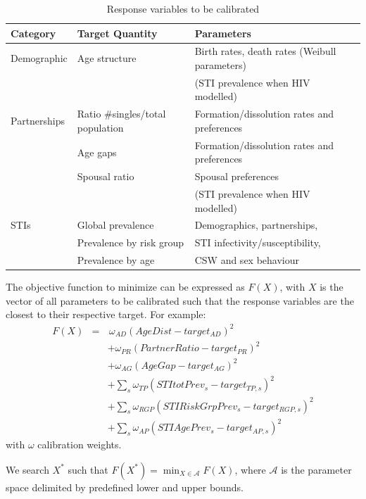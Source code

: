 \documentclass[11pt, onecolumn]{article}
\begin{document}
\begin{table}[htdp]
\caption{Response variables to be calibrated}
\begin{center}
\begin{tabular}{lll}

\hline
\textbf{Category} & \textbf{Target Quantity} & \textbf{Parameters} \\

\hline
Demographic  &  Age structure & Birth rates, death rates (Weibull parameters)\\
 & & (STI prevalence when HIV modelled)\\
\hline
Partnerships  &  Ratio \#singles/total population  &  Formation/dissolution rates and preferences \\
  &  Age gaps &   Formation/dissolution rates and preferences  \\
  &  Spousal ratio & Spousal preferences \\
 & & (STI prevalence when HIV modelled)\\
\hline
STIs	& Global prevalence & Demographics, partnerships,\\
	& Prevalence by risk group & STI infectivity/susceptibility,\\
	& Prevalence by age & CSW and sex behaviour\\
\hline
\end{tabular}
\end{center}
\label{tab:calibration}
\end{table}


The objective function to minimize can be expressed as $F(X)$, with $X$ is the vector of all parameters to be calibrated such that the response variables are the closest to their respective target. For example:
\begin{eqnarray*}
F(X) & =&\,\omega_{AD}(AgeDist - target_{AD})^2 \\
& & + \omega_{PR}(PartnerRatio - target_{PR})^2 \\
& & + \omega_{AG}(AgeGap - target_{AG})^2 \\
& & +\sum_s \omega_{TP}(STItotPrev_s-target_{TP,s})^2 \\
& & +\sum_s \omega_{RGP}(STIRiskGrpPrev_s-target_{RGP,s})^2\\
& & +\sum_s \omega_{AP}(STIAgePrev_s-target_{AP,s})^2
\end{eqnarray*}
with $\omega$ calibration weights. 

We search $X^*$ such that $F(X^*)=\min_{X\in \mathcal{A}} F(X)$, where $\mathcal{A}$ is the parameter space delimited by predefined lower and upper bounds.
\end{document}

